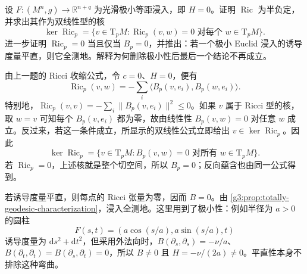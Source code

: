 \begin{exercise}\label{g3:ex:minimal-euclidean-ricci-nullity}
	设 \(F\colon(M^n,g)\to\mathbb R^{n+q}\) 为光滑极小等距浸入，即 \(H=0\)。证明 \(\operatorname{Ric}\) 为半负定，并求出其作为双线性型的核
	\[
		\ker\operatorname{Ric}_p
		=\{v\in\mathrm{T}_pM:\operatorname{Ric}_p(v,w)=0
		\text{ 对每个 }w\in\mathrm{T}_pM\}.
	\]
	进一步证明 \(\operatorname{Ric}_p=0\) 当且仅当 \(B_p=0\)，并推出：若一个极小 Euclid 浸入的诱导度量平直，则它全测地。解释为何删除极小性后最后一个结论不再成立。
\end{exercise}
\begin{solution}
	由上一题的 Ricci 收缩公式，令 \(c=0\)、\(H=0\)，便有
	\[
		\operatorname{Ric}_p(v,w)
		=-\sum_i\langle B_p(v,e_i),B_p(w,e_i)\rangle.
	\]
	特别地，\(\operatorname{Ric}_p(v,v)=-\sum_i\lVert B_p(v,e_i)\rVert^2\le0\)。如果 \(v\) 属于 Ricci 型的核，取 \(w=v\) 可知每个 \(B_p(v,e_i)\) 都为零，故由线性性 \(B_p(v,w)=0\) 对任意 \(w\) 成立。反过来，若这一条件成立，所显示的双线性公式立即给出 \(v\in\ker\operatorname{Ric}_p\)。因此
	\[
		\ker\operatorname{Ric}_p
		=\{v\in\mathrm{T}_pM:B_p(v,w)=0\text{ 对所有 }w\in\mathrm{T}_pM\}.
	\]
	若 \(\operatorname{Ric}_p=0\)，上述核就是整个切空间，所以 \(B_p=0\)；反向蕴含也由同一公式得到。

	若诱导度量平直，则每点的 Ricci 张量为零，因而 \(B=0\)。由 \cref{g3:prop:totally-geodesic-characterization}，浸入全测地。这里用到了极小性：例如半径为 \(a>0\) 的圆柱
	\[
		F(s,t)=(a\cos(s/a),a\sin(s/a),t)
	\]
	诱导度量为 \(\mathrm ds^2+\mathrm dt^2\)，但采用外法向时，\(B(\partial_s,\partial_s)=-\nu/a\)、\(B(\partial_t,\partial_t)=B(\partial_s,\partial_t)=0\)，所以 \(B\ne0\) 且 \(H=-\nu/(2a)\ne0\)。平直性本身不排除这种弯曲。
\end{solution}

